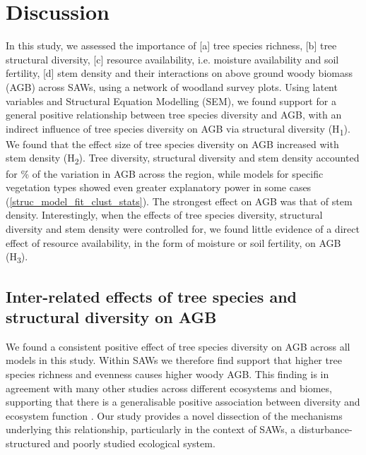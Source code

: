 \documentclass[11pt,a4paper]{article}
\begin{document}
\section*{Discussion}


In this study, we assessed the importance of [a] tree species richness, [b] tree structural diversity, [c] resource availability, i.e. moisture availability and soil fertility, [d] stem density and their interactions on above ground woody biomass (AGB) across SAWs, using a network of \nplots{} woodland survey plots. Using latent variables and Structural Equation Modelling (SEM), we found support for a general positive relationship between tree species diversity and AGB, with an indirect influence of tree species diversity on AGB via structural diversity (H\textsubscript{1}). We found that the effect size of tree species diversity on AGB increased with stem density (H\textsubscript{2}).  Tree diversity, structural diversity and stem density accounted for \srsq{}\% of the variation in AGB across the region, while models for specific vegetation types showed even greater explanatory power in some cases (\autoref{struc_model_fit_clust_stats}). The strongest effect on AGB was that of stem density. Interestingly, when the effects of tree species diversity, structural diversity and stem density were controlled for, we found little evidence of a direct effect of resource availability, in the form of moisture or soil fertility, on AGB (H\textsubscript{3}). 

\subsection*{Inter-related effects of tree species and structural diversity on AGB}

We found a consistent positive effect of tree species diversity on AGB across all models in this study. Within SAWs we therefore find support that higher tree species richness and evenness causes higher woody AGB. This finding is in agreement with many other studies across different ecosystems and biomes, supporting that there is a generalisable positive association between diversity and ecosystem function \citep{Liang2016, Cardinale2009}. Our study provides a novel dissection of the mechanisms underlying this relationship, particularly in the context of SAWs, a disturbance-structured and poorly studied ecological system.
\end{document}
